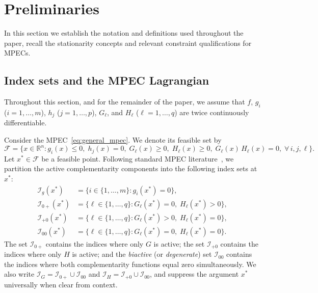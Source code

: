 \section{Preliminaries}
\label{sec:prelim}

In this section we establish the notation and definitions used throughout the paper, recall the stationarity concepts and relevant constraint qualifications for MPECs.


\subsection{Index sets and the MPEC Lagrangian}
\label{sec:notation}

Throughout this section, and for the remainder of the paper, we assume
that $f$, $g_i$ ($i=1,\ldots,m$), $h_j$ ($j=1,\ldots,p$), $G_\ell$,
and $H_\ell$ ($\ell=1,\ldots,q$) are twice continuously differentiable.

Consider the MPEC~\eqref{eq:general_mpec}. We denote its
feasible set by
\begin{equation}
  \mathcal{F} = \bigl\{x \in \mathbb{R}^n : g_i(x) \leq 0,\;
    h_j(x) = 0,\; G_\ell(x) \geq 0,\; H_\ell(x) \geq 0,\;
    G_\ell(x)\,H_\ell(x) = 0,\;
    \forall\, i,j,\ell\bigr\}.
  \label{eq:feasible_set}
\end{equation}
Let $x^* \in \mathcal{F}$ be a feasible point. Following standard MPEC
literature~\citep{LuoPangRalph1996,ScheelScholtes2000}, we partition the active
complementarity components into the following index sets at $x^*$:
\begin{align}
  \mathcal{I}_g(x^*) &= \{i \in \{1,\ldots,m\} : g_i(x^*) = 0\},
    \label{eq:Ig} \\
  \mathcal{I}_{0+}(x^*) &= \{\ell \in \{1,\ldots,q\} : G_\ell(x^*) = 0,\;
    H_\ell(x^*) > 0\},  \label{eq:I0p} \\
  \mathcal{I}_{+0}(x^*) &= \{\ell \in \{1,\ldots,q\} : G_\ell(x^*) > 0,\;
    H_\ell(x^*) = 0\},  \label{eq:Ip0} \\
  \mathcal{I}_{00}(x^*) &= \{\ell \in \{1,\ldots,q\} : G_\ell(x^*) = 0,\;
    H_\ell(x^*) = 0\}.  \label{eq:I00}
\end{align}
The set $\mathcal{I}_{0+}$ contains the indices where only $G$ is
active; the set $\mathcal{I}_{+0}$ contains the indices where only $H$
is active; and the \emph{biactive} (or \emph{degenerate}) set
$\mathcal{I}_{00}$ contains the indices where both complementarity
functions equal zero simultaneously.
We also write $\mathcal{I}_G = \mathcal{I}_{0+} \cup \mathcal{I}_{00}$
and $\mathcal{I}_H = \mathcal{I}_{+0} \cup \mathcal{I}_{00}$, and suppress
the argument $x^*$ universally when clear from context.

